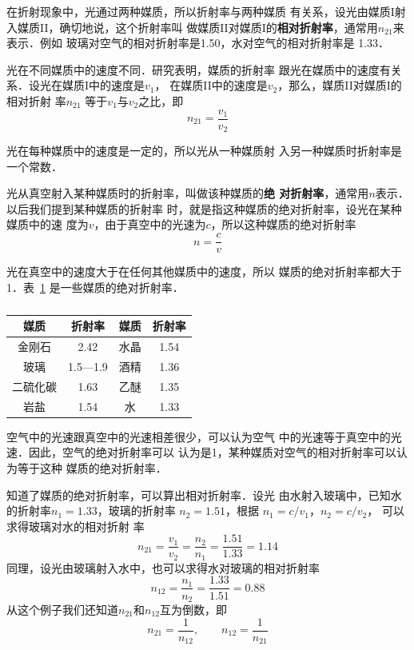     在折射现象中，光通过两种媒质，所以折射率与两种媒质
    有关系，设光由媒质I射入媒质II，确切地说，这个折射率叫
    做媒质II对媒质I的\textbf{相对折射率}，通常用$n_{21}$来表示．例如
    玻璃对空气的相对折射率是1.50，水对空气的相对折射率是
    1.33．

    光在不同媒质中的速度不同．研究表明，媒质的折射率
    跟光在媒质中的速度有关系．设光在媒质I中的速度是$v_1$，
    在媒质II中的速度是$v_2$，那么，媒质II对媒质I的相对折射
    率$n_{21}$
    等于$v_1$与$v_2$之比，即
\[n_{21}=\frac{v_1}{v_2} \]

    光在每种媒质中的速度是一定的，所以光从一种媒质射
    入另一种媒质时折射率是一个常数．

    光从真空射入某种媒质时的折射率，叫做该种媒质的\textbf{绝
    对折射率}，通常用$n$表示．以后我们提到某种媒质的折射率
    时，就是指这种媒质的绝对折射率，设光在某种媒质中的速
    度为$v$，由于真空中的光速为$c$，所以这种媒质的绝对折射率
\[n=\frac{c}{v} \]

    光在真空中的速度大于在任何其他媒质中的速度，所以
    媒质的绝对折射率都大于1．表~\ref{tab_C_5-2} 是一些媒质的绝对折射率．
    \begin{table}[htbp]
    	\centering
    	\caption{}\label{tab_C_5-2}
        \begin{tabular}{cccc}
	        \toprule
	         媒质 & 折射率 & 媒质 & 折射率\\
	        \midrule
			  金刚石  &  2.42 &  水晶   & 1.54\\
			  玻璃   &   1.5—1.9  &  酒精  &  1.36\\
			  二硫化碳  & 1.63  &  乙醚  &  1.35\\
			  岩盐  &  1.54  &  水   &  1.33\\ 
	        	\bottomrule
            \end{tabular}
        \end{table}

空气中的光速跟真空中的光速相差很少，可以认为空气
中的光速等于真空中的光速．因此，空气的绝对折射率可以
认为是1，某种媒质对空气的相对折射率可以认为等于这种
媒质的绝对折射率．

知道了媒质的绝对折射率，可以算出相对折射率．设光
由水射入玻璃中，已知水的折射率$n_1=1.33$，玻璃的折射率
$n_2=1.51$，根据
$n_1=c/v_1$，$n_2=c/v_2$，
可以求得玻璃对水的相对折射
率
$$n_{21}=\frac{v_1}{v_2}=\frac{n_2}{n_1}=\frac{1.51}{1.33}=1.14$$
同理，设光由玻璃射入水中，也可以求得水对玻璃的相对折射率
\[n_{12}=\frac{n_1}{n_2}=\frac{1.33}{1.51}=0.88 \]
从这个例子我们还知道$n_{21}$和$n_{12}$互为倒数，即
\[n_{21}=\frac{1}{n_{12}},\qquad n_{12}=\frac{1}{n_{21}}  \]

